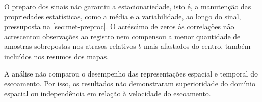 O preparo dos sinais não garantiu a estacionariedade, isto é,
a manutenção das propriedades estatísticas, como a média e a variabilidade,
ao longo do sinal, pressuposta na \autoref{sec:met-preproc}.
O acréscimo de zeros às correlações não acrescentou observações ao registro
nem compensou a menor quantidade de amostras sobrepostas nos atrasos
relativos $b$ mais afastados do centro, também incluídos nos resumos dos mapas.

A análise não comparou o desempenho das representações espacial e temporal
do escoamento. Por isso, os resultados não demonstraram superioridade do
domínio espacial ou independência em relação à velocidade do escoamento.

